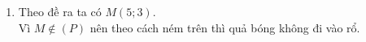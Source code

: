 \begin{bt}
{\begin{enumerate}
	Gọi phương trình của parabol có dạng $(P)\colon y=ax^2+bx+c$, $a\ne 0$.\\
	Vì $(P)$ qua $A(0;3)$ và có đỉnh là $I(3;5)$ nên ta có\\
	$\heva{& \dfrac{-b}{2a}=3\\& 9a+3b+c=5 \\&c=3} \Leftrightarrow \heva{&a=\dfrac{-2}{9} \\&b= \dfrac{4}{3}\\& c=3.}$\\
	Vậy $(P)\colon y=\dfrac{-2}{9}x^2+\dfrac{4}{3}x+3$.
	\item Theo đề ra ta có $M(5;3)$.\\
	Vì $M \notin (P)$ nên theo cách ném trên thì quả bóng không đi vào rổ.	
\end{enumerate}
}
\end{bt}

